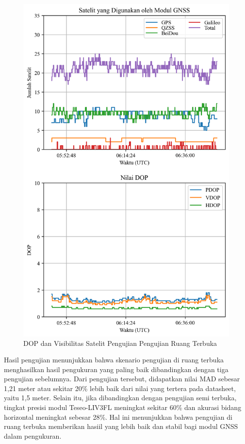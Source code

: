 \begin{figure}[H]
	\centering
	\includegraphics[width=12cm]{contents/chapter-4/4-skenario-outdoor/sats_dop.png}
	\caption{DOP dan Visibilitas Satelit Pengujian Pengujian Ruang Terbuka}
	\label{Fig: outdoor-dop_sats}
\end{figure}

Hasil pengujian menunjukkan bahwa skenario pengujian di ruang terbuka menghasilkan hasil pengukuran yang paling baik dibandingkan dengan tiga pengujian sebelumnya. Dari pengujian tersebut, didapatkan nilai MAD sebesar 1,21 meter atau sekitar 20\% lebih baik dari nilai yang tertera pada datasheet, yaitu 1,5 meter. Selain itu, jika dibandingkan dengan pengujian semi terbuka, tingkat presisi modul Teseo-LIV3FL meningkat sekitar 60\% dan akurasi bidang horizontal meningkat sebesar 28\%. Hal ini menunjukkan bahwa pengujian di ruang terbuka memberikan hasiil yang lebih baik dan stabil bagi modul GNSS dalam pengukuran. 

